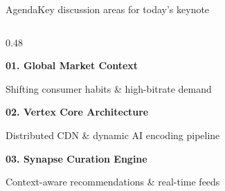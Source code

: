 \documentclass[aspectratio=169,11pt]{beamer}
\begin{document}
\begin{frame}{Agenda}{Key discussion areas for today's keynote}
  \vspace{2pt}
  \begin{columns}[T]
    \begin{column}{0.48\textwidth}
      \begin{tcolorbox}[keynotecard]
        \begin{minipage}{0.12\textwidth}
          {\Large\color{accentblue}\faGlobe}
        \end{minipage}%
        \begin{minipage}{0.85\textwidth}
          {\small\bfseries\color{textdark} 01. Global Market Context} \par
          {\tiny\color{textmuted} Shifting consumer habits \& high-bitrate demand}
        \end{minipage}
      \end{tcolorbox}
      \vspace{3pt}
      \begin{tcolorbox}[keynotecard]
        \begin{minipage}{0.12\textwidth}
          {\Large\color{accentblue}\faServer}
        \end{minipage}%
        \begin{minipage}{0.85\textwidth}
          {\small\bfseries\color{textdark} 02. Vertex Core Architecture} \par
          {\tiny\color{textmuted} Distributed CDN \& dynamic AI encoding pipeline}
        \end{minipage}
      \end{tcolorbox}
      \vspace{3pt}
      \begin{tcolorbox}[keynotecard]
        \begin{minipage}{0.12\textwidth}
          {\Large\color{accentblue}\faBrain}
        \end{minipage}%
        \begin{minipage}{0.85\textwidth}
          {\small\bfseries\color{textdark} 03. Synapse Curation Engine} \par
          {\tiny\color{textmuted} Context-aware recommendations \& real-time feeds}
        \end{minipage}
      \end{tcolorbox}
    \end{column}
    

\end{columns}
\end{frame}
\end{document}
